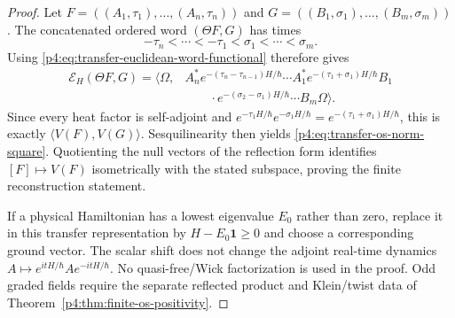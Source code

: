 \documentclass[12pt,a4paper]{article}
\begin{document}
\begin{proof}
Let
\(F=((A_1,\tau_1),\ldots,(A_n,\tau_n))\) and
\(G=((B_1,\sigma_1),\ldots,(B_m,\sigma_m))\).  The concatenated ordered word
\((\Theta F,G)\) has times
\[
 -\tau_n<\cdots<-\tau_1<\sigma_1<\cdots<\sigma_m.
\]
Using \eqref{p4:eq:transfer-euclidean-word-functional} therefore gives
\[
\begin{aligned}
 \mathcal E_H(\Theta F,G)
 =\langle\Omega,&
 A_n^*e^{-(\tau_n-\tau_{n-1})H/\hbar}\cdots
 A_1^*e^{-(\tau_1+\sigma_1)H/\hbar}B_1\\
 &\qquad\cdot e^{-(\sigma_2-\sigma_1)H/\hbar}\cdots B_m\Omega\rangle.
\end{aligned}
\]
Since every heat factor is self-adjoint and
\(e^{-\tau_1H/\hbar}e^{-\sigma_1H/\hbar}
=e^{-(\tau_1+\sigma_1)H/\hbar}\), this is exactly
\(\langle V(F),V(G)\rangle\).  Sesquilinearity then yields
\eqref{p4:eq:transfer-os-norm-square}.  Quotienting the null vectors of the
reflection form identifies \([F]\mapsto V(F)\) isometrically with the stated
subspace, proving the finite reconstruction statement.

If a physical Hamiltonian has a lowest eigenvalue \(E_0\) rather than zero,
replace it in this transfer representation by
\(H-E_0\mathbf1\ge0\) and choose a corresponding ground vector.  The scalar
shift does not change the adjoint real-time dynamics
\(A\mapsto e^{itH/\hbar}Ae^{-itH/\hbar}\).  No quasi-free/Wick factorization
is used in the proof.  Odd graded fields require the separate reflected
product and Klein/twist data of Theorem~\ref{p4:thm:finite-os-positivity}.
\end{proof}
\end{document}
